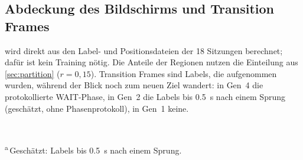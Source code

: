 \subsection{Abdeckung des Bildschirms und Transition Frames}

 wird direkt aus den Label- und Positionsdateien der 18
Sitzungen berechnet; dafür ist kein Training nötig.
Die Anteile der Regionen nutzen die Einteilung aus \cref{sec:partition}
($r=0,15$). Transition Frames sind Labels, die aufgenommen wurden, während der
Blick noch zum neuen Ziel wandert: in Gen~4 die protokollierte WAIT-Phase, in
Gen~2 die Labels bis \SI{0,5}{\second} nach einem Sprung (geschätzt, ohne
Phasenprotokoll), in Gen~1 keine.

\begin{table}[htbp]
  \centering
  \caption[Abdeckung und Transition Frames pro Gestaltung]{Abdeckung des Bildschirms und Transition Frames pro Gestaltung
           (Mittelwert über die Sitzungen jeder Generation). Zellen: Anteil
           der 100 Zellen eines $10\times10$-Rasters mit mindestens einem
           Label; Abst.: mittlerer Abstand der Ziele von der Bildschirmmitte
           (normierte Einheiten).}
  \label{tab:design}
  \small
  \setlength{\tabcolsep}{4pt}
  \\[1mm]
  \parbox{0.95\linewidth}{\footnotesize \textsuperscript{a}\,Geschätzt:
  Labels bis \SI{0,5}{\second} nach einem Sprung.}
\end{table}

